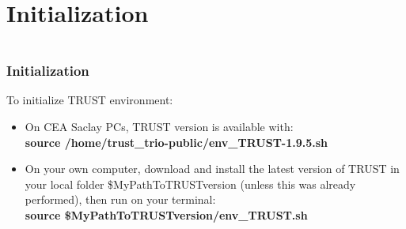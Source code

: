 \documentclass[10pt, hyperref={unicode=true,pdfusetitle, bookmarks=true,bookmarksnumbered=false,bookmarksopen=false, breaklinks=false,pdfborder={0 0l 1},backref=true,colorlinks=true,linkcolor=darkblue,pageanchor}]{beamer}
\begin{document}
\section{{\bf{Initialization}}}\label{init_trust}
\begin{frame}
\begin{small}
\begin{columns}[c] 
\tableofcontents[sections={1-8},currentsection, currentsubsection]
\tableofcontents[sections={9-16},currentsection, currentsubsection]
\end{columns}
\end{small}
\end{frame}
\begin{frame}
\frametitle{Initialization}
\begin{block}{}

To initialize TRUST environment:
\begin{itemize}
\item On CEA Saclay PCs, TRUST version is available with:\\
\textbf{source  /home/trust\_trio-public/env\_TRUST-1.9.5.sh}
\item On your own computer, download and install the latest version of TRUST in your local folder \$MyPathToTRUSTversion (unless this was already performed), then run on your terminal:\\
\textbf{source  \$MyPathToTRUSTversion/env\_TRUST.sh}
\end{itemize}


\end{block}
\end{frame}
\end{document}
